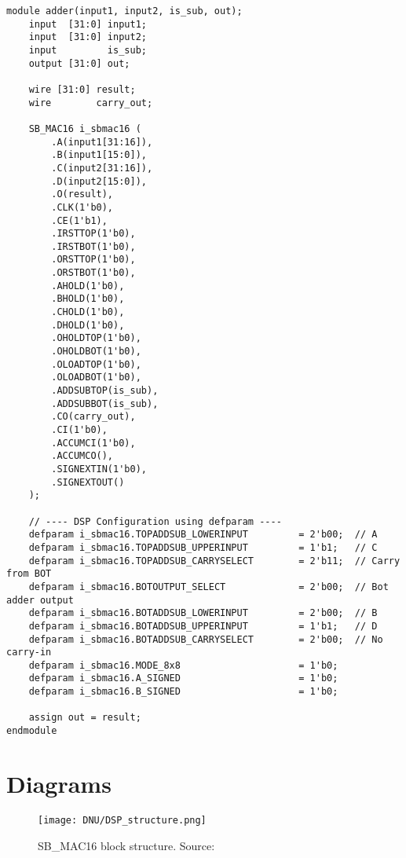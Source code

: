 \documentclass[a4paper,10pt]{article}
\begin{document}
\begin{lstlisting}[style=verilog-style, caption=
    {DSP implementation in adder.v}, label={prog:DSP}]
module adder(input1, input2, is_sub, out);
    input  [31:0] input1;
    input  [31:0] input2;
    input         is_sub;
    output [31:0] out;

    wire [31:0] result;
    wire        carry_out;

    SB_MAC16 i_sbmac16 (
        .A(input1[31:16]),  
        .B(input1[15:0]),  
        .C(input2[31:16]), 
        .D(input2[15:0]),  
        .O(result),
        .CLK(1'b0),
        .CE(1'b1),
        .IRSTTOP(1'b0), 
        .IRSTBOT(1'b0),
        .ORSTTOP(1'b0), 
        .ORSTBOT(1'b0),
        .AHOLD(1'b0), 
        .BHOLD(1'b0),
        .CHOLD(1'b0), 
        .DHOLD(1'b0),
        .OHOLDTOP(1'b0),
        .OHOLDBOT(1'b0),
        .OLOADTOP(1'b0), 
        .OLOADBOT(1'b0),
        .ADDSUBTOP(is_sub), 
        .ADDSUBBOT(is_sub),
        .CO(carry_out),
        .CI(1'b0), 
        .ACCUMCI(1'b0),
        .ACCUMCO(), 
        .SIGNEXTIN(1'b0), 
        .SIGNEXTOUT()
    );

    // ---- DSP Configuration using defparam ----
    defparam i_sbmac16.TOPADDSUB_LOWERINPUT         = 2'b00;  // A
    defparam i_sbmac16.TOPADDSUB_UPPERINPUT         = 1'b1;   // C
    defparam i_sbmac16.TOPADDSUB_CARRYSELECT        = 2'b11;  // Carry from BOT
    defparam i_sbmac16.BOTOUTPUT_SELECT             = 2'b00;  // Bot adder output
    defparam i_sbmac16.BOTADDSUB_LOWERINPUT         = 2'b00;  // B
    defparam i_sbmac16.BOTADDSUB_UPPERINPUT         = 1'b1;   // D
    defparam i_sbmac16.BOTADDSUB_CARRYSELECT        = 2'b00;  // No carry-in
    defparam i_sbmac16.MODE_8x8                     = 1'b0;
    defparam i_sbmac16.A_SIGNED                     = 1'b0;
    defparam i_sbmac16.B_SIGNED                     = 1'b0;

    assign out = result;
endmodule
\end{lstlisting}

\section{Diagrams}

\begin{figure}[H]
    \centering
    \texttt{[image: DNU/DSP\_structure.png]}
    \caption{SB\_MAC16 block structure. Source: \cite{DSP_guide}}
    \label{fig:dsp}
\end{figure}
\end{document}

